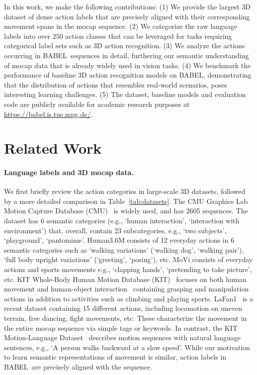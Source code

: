 \documentclass[final]{cvpr}
\def\babel{BABEL}
\begin{document}
In this work, we make the following contributions:
(1) We provide the largest 3D dataset of dense action labels that are precisely aligned with their corresponding movement spans in the mocap sequence. 
(2) We categorize the raw language labels into over $250$ action classes that can be leveraged for tasks requiring categorical label sets such as 3D action recognition. 
(3) We analyze the actions occurring in \babel~sequences in detail, furthering our semantic understanding of mocap data that is already widely used in vision tasks. 
(4) We benchmark the performance of baseline 3D action recognition models on \babel, demonstrating that the distribution of actions that resembles real-world scenarios, poses interesting learning challenges. 
(5) The dataset, baseline models and evaluation code are publicly available for academic research purposes at \url{https://babel.is.tue.mpg.de/}. \section{Related Work}
\label{sec:related_work}


\noindent
\paragraph{Language labels and 3D mocap data.} 
We first briefly review the action categories in large-scale 3D datasets, followed by a more detailed comparison in Table~\ref{tab:datasets}. 
The CMU Graphics Lab Motion Capture Database (CMU)~\cite{cmu_mocap} is widely used, and has 2605 sequences. The dataset has 6 semantic categories (e.g., `human interaction', `interaction with environment') that, overall, contain 23 subcategories, e.g., `two subjects', `playground', `pantomime'. 
Human3.6M \cite{h36m_pami} consists of 12 everyday actions in 6 semantic categories such as `walking variations' (`walking dog', `walking pair'), `full body upright variations' (`greeting', `posing'), etc. 
MoVi \cite{ghorbani2020movi} consists of everyday actions and sports movements e.g., `clapping hands', `pretending to take picture', etc. 
KIT Whole-Body Human Motion Database (KIT)~\cite{DBLP:conf/icar/ManderyTDVA15} focuses on both human movement and human-object interaction~\cite{DBLP:conf/eccv/TaheriGBT20}
containing grasping and manipulation actions in addition to activities such as climbing and playing sports. 
LaFan1~\cite{harvey2020robust} is a recent dataset containing 15 different actions, including locomotion on uneven terrain, free dancing, fight movements, etc. 
These characterize the movement in the entire mocap sequence via simple tags or keywords. 
In contrast, the KIT Motion-Language Dataset~\cite{DBLP:conf/icar/ManderyTDVA15} describes motion sequences with natural language sentences, e.g., `A person walks backward at a slow speed'. 
While our motivation to learn semantic representations of movement is similar, action labels in \babel~are precisely aligned with the sequence. 
\end{document}
